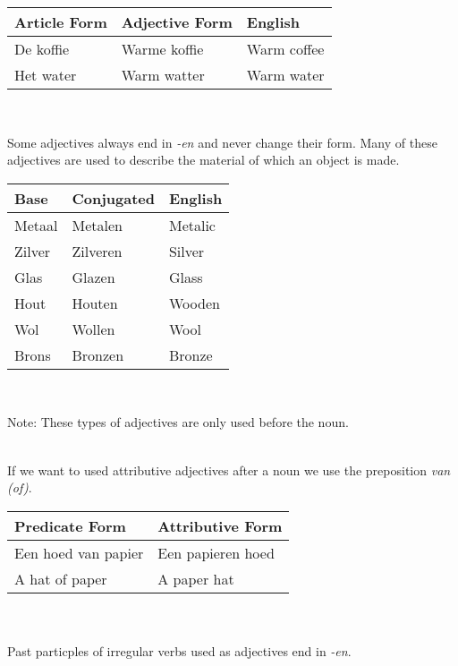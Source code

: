 \documentclass[letterpaper,11pt]{article}
\begin{document}
\begin{tabular}[t]{l l l}
    \textbf{Article Form} & \textbf{Adjective Form} & \textbf{English} \\
    \hline
    De koffie             & Warme koffie            & Warm coffee      \\
    Het water             & Warm watter             & Warm water       \\
    \hline
\end{tabular}
\\
\par{Some adjectives always end in \textit{-en} and never change their form.
Many of these adjectives are used to describe the material of which an object is
made.}
\\
\begin{tabular}[t]{l l l}
    \textbf{Base} & \textbf{Conjugated} & \textbf{English} \\
    \hline
    Metaal        & Metalen             & Metalic          \\
    Zilver        & Zilveren            & Silver           \\
    Glas          & Glazen              & Glass            \\
    Hout          & Houten              & Wooden           \\
    Wol           & Wollen              & Wool             \\
    Brons         & Bronzen             & Bronze           \\
    \hline
\end{tabular}
\\
\begin{small}
    Note: These types of adjectives are only used before the noun.
\end{small}
\\
If we want to used attributive adjectives after a noun we use the
preposition \textit{van (of)}.
\\
\begin{tabular}[t]{l l}
    \textbf{Predicate Form} & \textbf{Attributive Form} \\
    \hline
    Een hoed van papier     & Een papieren hoed         \\
    A hat of paper          & A paper hat               \\
    \hline
\end{tabular}
\\ \\
Past particples of irregular verbs used as adjectives end in \textit{-en}.
\end{document}
